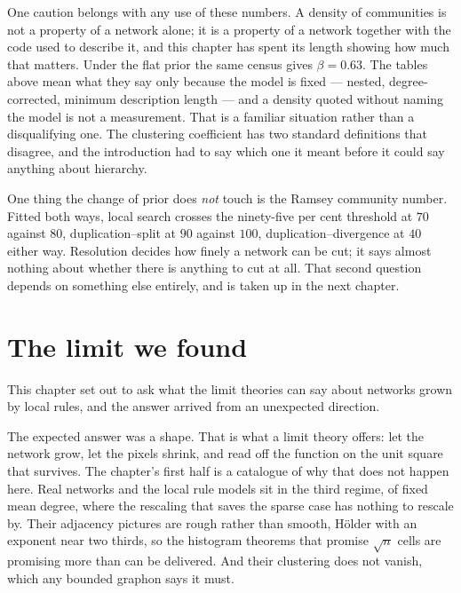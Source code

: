 One caution belongs with any use of these numbers. A density of communities is
not a property of a network alone; it is a property of a network together with the
code used to describe it, and this chapter has spent its length showing how much
that matters. Under the flat prior the same census gives $\beta=0.63$. The tables
above mean what they say only because the model is fixed --- nested,
degree-corrected, minimum description length --- and a density quoted without
naming the model is not a measurement. That is a familiar situation rather than a
disqualifying one. The clustering coefficient has two standard definitions that
disagree, and the introduction had to say which one it meant before it could say
anything about hierarchy.

One thing the change of prior does \emph{not} touch is the Ramsey community
number. Fitted both ways, local search crosses the ninety-five per cent threshold
at $70$ against $80$, duplication--split at $90$ against $100$,
duplication--divergence at $40$ either way. Resolution decides how finely a
network can be cut; it says almost nothing about whether there is anything to cut
at all. That second question depends on something else entirely, and is taken up
in the next chapter.

\section{The limit we found}
\label{sec:gr-conclusion}

This chapter set out to ask what the limit theories can say about networks grown
by local rules, and the answer arrived from an unexpected direction.

The expected answer was a shape. That is what a limit theory offers: let the
network grow, let the pixels shrink, and read off the function on the unit square
that survives. The chapter's first half is a catalogue of why that does not
happen here. Real networks and the local rule models sit in the third regime, of fixed
mean degree, where the rescaling that saves the sparse case has nothing to
rescale by. Their adjacency pictures are rough rather than smooth, H\"older with
an exponent near two thirds, so the histogram theorems that promise $\sqrt n$
cells are promising more than can be delivered. And their clustering does not
vanish, which any bounded graphon says it must.


